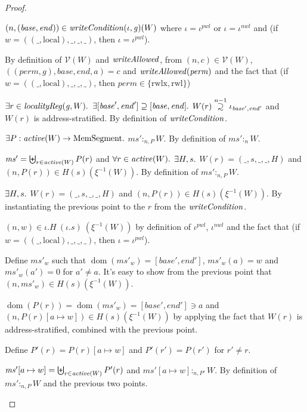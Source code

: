 \documentclass[a4paper]{article}
\newcommand{\update}[2]{[#1 \mapsto #2]}
\newcommand\supsetsim{\mathrel{\ooalign{\raise.2ex\hbox{$\supset$}\cr
      \hidewidth\lower.8ex\hbox{\scalebox{0.9}{$\sim$}}\hidewidth\cr}}}
\newcommand{\nsupsim}[1][n]{\stackrel{\tiny{#1}}{\supsetsim}}
\DeclareMathOperator{\dom}{dom}
\newcommand{\var}[1]{\mathit{#1}}
\newcommand{\hs}{\var{ms}}
\newcommand{\ms}{\hs}
\newcommand{\gl}{\var{g}}
\newcommand{\addr}{\var{a}}
\newcommand{\start}{\var{base}}
\newcommand{\addrend}{\var{end}}
\newcommand{\heap}{\var{mem}}
\newcommand{\perm}{\var{perm}}
\newcommand{\nwl}{\var{nwl}}
\newcommand{\pwl}{\var{pwl}}
\newcommand{\plainfun}[2]{
  \ifthenelse{\equal{#2}{}}
  {\mathit{#1}}
  {\mathit{#1}(#2)}
}
\newcommand{\writeAllowed}[1]{\plainfun{writeAllowed}{#1}}
\newcommand{\writeCond}[1]{\plainfun{writeCondition}{#1}}
\newcommand{\activeReg}[1]{\plainfun{active}{#1}}
\newcommand{\heapSat}[3][\heap]{#1 :_{#2} #3}
\newcommand{\memSatPar}[4][n]{\heapSat[#2]{#1 , #4}{#3}}
\newcommand{\asmType}{\plaindom{AsmType}}
\newcommand{\plaindom}[1]{\mathrm{#1}}
\newcommand{\HeapSegments}{\plaindom{MemSegment}}
\newcommand{\intr}[2]{\mathcal{#1}}
\newcommand{\valueintr}[1]{\intr{V}{#1}}
\newcommand{\stdvr}{\valueintr{\asmType}}
\newcommand{\npair}[2][n]{\left(#1,#2 \right)}
\newcommand{\plainperm}[1]{\mathrm{#1}}
\newcommand{\readwritel}{\plainperm{rwl}}
\newcommand{\rwlx}{\plainperm{rwlx}}
\newcommand{\local}{\plainperm{local}}
\begin{document}
 \begin{proof}
   \begin{enumproof}
   \item $\npair{(\start,\addrend)} \in \writeCond{}(\iota,\gl)(W)$ where $\iota
     = \iota^\pwl$ or $\iota = \iota^\nwl$ and (if $\var{w} =
     ((\_,\local),\_,\_,\_)$, then $\iota = \iota^\pwl$).

     By definition of $\stdvr(W)$ and $\writeAllowed{}$, from
     $\npair{c}\in\stdvr(W)$, $((\perm,\gl),\start,\addrend,\addr) = c$ and
     $\writeAllowed{\perm}$ and the fact that (if $\var{w} =
     ((\_,\local),\_,\_,\_)$, then $\perm \in \{\rwlx,\readwritel \}$)
   \item $\exists r \in \var{localityReg}(\gl,W) \ldotp$ $\exists
     [\start',\addrend'] \supseteq [\start,\addrend] \ldotp$ $W(r)\nsupsim[n-1]
     \iota_{\start',\addrend'}$ and $W(r)$ is address-stratified. By definition
     of $\writeCond{}$.
   \item $\exists P : \activeReg{W} \rightarrow \HeapSegments \ldotp$
     $\memSatPar{\ms'}{W}{P}$. By definition of $\heapSat[\ms']{n}{W}$.
   \item $\ms' = \biguplus_{r\in\activeReg{W}}P(r)$ and $\forall r \in
     \activeReg{W} \ldotp$ $\exists H,s \ldotp$ $W(r) = (\_,s,\_,\_,H)$ and
     $\npair[n]{P(r)} \in H(s)(\xi^{-1}(W))$. By definition of
     $\memSatPar{\ms'}{W}{P}$.
   \item $\exists H,s \ldotp$ $W(r) = (\_,s,\_,\_,H)$ and
     $\npair[n]{P(r)} \in H(s)(\xi^{-1}(W))$. By instantiating the previous
     point to the $r$ from the $\writeCond{}$.
   \item $\npair{w} \in \iota.H~(\iota.s)~(\xi^{-1}(W))$ by definition of
     $\iota^\pwl$, $\iota^\nwl$ and the fact that (if $\var{w} =
     ((\_,\local),\_,\_,\_)$, then $\iota = \iota^\pwl$).
   \item Define $\ms'_w$ such that $\dom(\ms'_w) = [\start',\addrend']$,
     $\ms'_w(\addr) = w$ and $\ms'_w(\addr') = 0$ for $\addr' \neq \addr$. It's
     easy to show from the previous point that $\npair{\ms'_w} \in
     H(s)(\xi^{-1}(W))$.
   \item $\dom(P(r)) = \dom(\ms'_w) = [\start',\addrend'] \ni \addr$ and
     $\npair{P(r)\update{\addr}{w}} \in H(s)(\xi^{-1}(W))$ by applying the fact
     that $W(r)$ is address-stratified, combined with the previous point.
   \item Define $P'(r) = P(r)\update{a}{w}$ and $P'(r') = P(r')$ for $r' \neq r$.
   \item $\ms'\update{a}{w} = \biguplus_{r\in\activeReg{W}}
     P'(r)$ and $\ms'\update{a}{w} :_{n,P'} W$. By definition of
     $\memSatPar{\ms'}{W}{P}$ and the previous two points.
   \end{enumproof}
 \end{proof}
  
\end{document}
